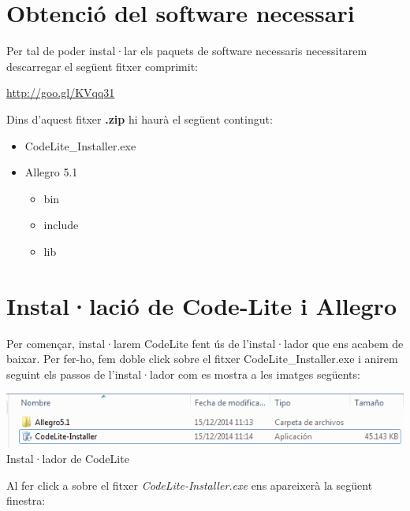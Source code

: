 \documentclass[11pt]{article}
\begin{document}
\section{Obtenció del software necessari}
Per tal de poder instal·lar els paquets de software necessaris necessitarem descarregar el següent fitxer comprimit:
\begin{center}
	\url{http://goo.gl/KVqq31}
\end{center}

Dins d'aquest fitxer \textbf{.zip} hi haurà el següent contingut:

\begin{itemize}
	\item CodeLite\_Installer.exe
	\item Allegro 5.1
		\begin{itemize}
			\item bin
			\item include
			\item lib
		\end{itemize}
\end{itemize}

\section{Instal·lació de Code-Lite i Allegro}
\noindent Per començar, instal·larem CodeLite fent ús de l'instal·lador que ens acabem de baixar. Per fer-ho, fem  doble click sobre el fitxer CodeLite\_Installer.exe i anirem seguint els passos de l'instal·lador com es mostra a les imatges següents:

\begin{center}

\includegraphics[scale=0.6]{img/Installer_1.png}\\
\small{Instal·lador de CodeLite}\\
\end{center}

\newpage
\noindent Al fer click a sobre el fitxer \textit{CodeLite-Installer.exe} ens apareixerà la següent finestra:
\end{document}
